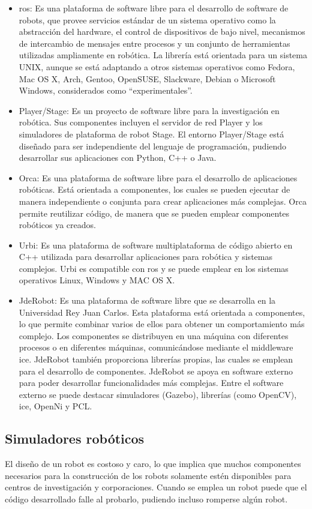 \begin{itemize}
\item \acrfull{ros}: Es una plataforma de software libre para el desarrollo de software de robots, que provee servicios estándar de un sistema operativo como la abstracción del hardware, el control de dispositivos de bajo nivel, mecanismos de intercambio de mensajes entre procesos y un conjunto de herramientas utilizadas ampliamente en robótica. La librería está orientada para un sistema UNIX, aunque se está adaptando a otros sistemas operativos como Fedora, Mac OS X, Arch, Gentoo, OpenSUSE, Slackware, Debian o Microsoft Windows, considerados como ``experimentales''.
\item Player/Stage: Es un proyecto de software libre para la investigación en robótica. Sus componentes incluyen el servidor de red Player y los simuladores de plataforma de robot Stage. El entorno Player/Stage está diseñado para ser independiente del lenguaje de programación, pudiendo desarrollar sus aplicaciones con Python, C++ o Java.
\item Orca: Es una plataforma de software libre para el desarrollo de aplicaciones robóticas. Está orientada a componentes, los cuales se pueden ejecutar de manera independiente o conjunta para crear aplicaciones más complejas. Orca permite reutilizar código, de manera que se pueden emplear componentes robóticos ya creados.
\item Urbi: Es una plataforma de software multiplataforma de código abierto en C++ utilizada para desarrollar aplicaciones para robótica y sistemas complejos. Urbi es compatible con \acrshort{ros} y se puede emplear en los sistemas operativos Linux, Windows y MAC OS X.
\item JdeRobot: Es una plataforma de software libre que se desarrolla en la Universidad Rey Juan Carlos. Esta plataforma está orientada a componentes, lo que permite combinar varios de ellos para obtener un comportamiento más complejo. Los componentes se distribuyen en una máquina con diferentes procesos o en diferentes máquinas, comunicándose mediante el middleware \acrfull{ice}. JdeRobot también proporciona librerías propias, las cuales se emplean para el desarrollo de componentes. JdeRobot se apoya en software externo para poder desarrollar funcionalidades más complejas. Entre el software externo se puede destacar simuladores (Gazebo), librerías (como OpenCV), \acrshort{ice}, OpenNi y PCL.
\end{itemize}

\subsection{Simuladores robóticos}
El diseño de un robot es costoso y caro, lo que implica que muchos componentes necesarios para la construcción de los robots solamente estén disponibles para centros de investigación y corporaciones. Cuando se emplea un robot puede que el código desarrollado falle al probarlo, pudiendo incluso romperse algún robot.\\

